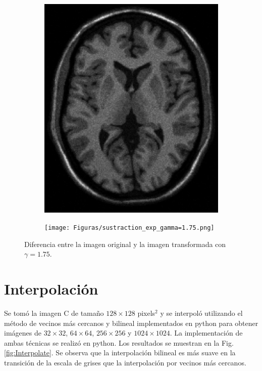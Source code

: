 \documentclass[11pt,twocolumn,twoside]{opticajnl}
\begin{document}
\begin{figure}[h]
\begin{subfigure}[h]{0.24\linewidth}
            \includegraphics[width=\textwidth]{Figuras/ImageA_exp_gamma=1.75.png}
        \end{subfigure}
        \begin{subfigure}[h]{0.24\linewidth}
            \centering
            \texttt{[image: Figuras/sustraction\_exp\_gamma=1.75.png]}
        \end{subfigure}
                \caption{Diferencia entre la imagen original y la imagen transformada con $\gamma = 1.75$.}
                \label{fig:Exptrans1.75_sustraction}
\end{figure}

\section{Interpolación \label{sec:ej3}}

\vspace{0.3cm}

Se tomó la imagen C de tamaño $128\times128$ pixels$^2$ y se interpoló utilizando el método de vecinos más cercanos y bilineal implementados en python para obtener imágenes de $32\times32$, $64\times64$, $256\times256$ y $1024\times1024$. La implementación de ambas técnicas se realizó en python. Los resultados se muestran en la Fig. \ref{fig:Interpolate}. Se observa que la interpolación bilineal es más suave en la transición de la escala de grises que la interpolación por vecinos más cercanos.
\end{document}
